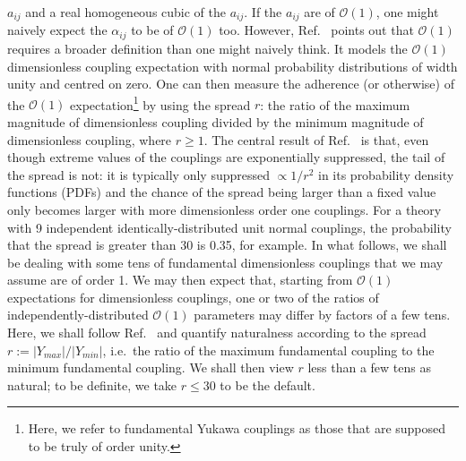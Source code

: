 \documentclass[11pt,letterpaper]{article}
\begin{document}
$a_{ij}$ and a real homogeneous cubic of the $a_{ij}$. If the $a_{ij}$ are of
${\mathcal O}(1)$, one might naively expect the $\alpha_{ij}$ to be of ${\mathcal O}(1)$ too.
However, Ref.~\cite{Allanach:2026rkb} points out that 
${\mathcal O}(1)$ requires a broader
definition than one might naively think. 
It models the ${\mathcal O}(1)$ dimensionless coupling expectation with 
normal probability distributions of width unity and
centred on zero. One can then measure the adherence (or otherwise) of the ${\mathcal O}(1)$ expectation\footnote{Here, we refer to fundamental Yukawa couplings as
those that are supposed to be truly of order unity.} by using the spread $r$:
the ratio of the maximum magnitude of dimensionless coupling divided 
by the minimum magnitude of dimensionless coupling, where $r \geq 1$. The central result of
Ref.~\cite{Allanach:2026rkb} is that, even though extreme values of the
couplings are exponentially suppressed, the tail of the spread is not:
it is typically only suppressed $\propto 1/r^2$ in its probability
density functions (PDFs) and the chance of 
the spread being larger than 
a fixed value only becomes larger with more dimensionless order one couplings.  
For a theory with 9 independent identically-distributed unit normal couplings, the probability that the spread is greater than 30 is 0.35, for example.
In
what follows, we shall be dealing with some tens of fundamental dimensionless
couplings that we may assume are of order 1. We may then expect
that, starting from ${\mathcal O}(1)$ expectations for dimensionless couplings, one or two of the ratios of
independently-distributed ${\mathcal O}(1)$ parameters may differ by factors of a
few tens.
Here, we shall follow 
Ref.~\cite{Allanach:2026rkb} and quantify naturalness according to the spread $r:=|Y_{max}|/|Y_{min}|$, i.e.\ the
ratio of the maximum fundamental coupling to the
minimum fundamental coupling.
We shall then view $r$ less than a few tens as natural; to be definite,
we take $r \leq 30$ to be the default.
\end{document}
